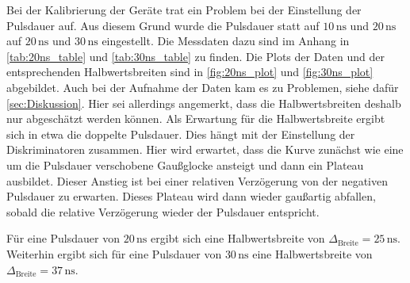 Bei der Kalibrierung der Geräte trat ein Problem bei der Einstellung der Pulsdauer auf.
Aus diesem Grund wurde die Pulsdauer statt auf $10 \, \unit{\nano\second}$ und $20 \, \unit{\nano\second}$ auf $20 \, \unit{\nano\second}$ und $30 \, \unit{\nano\second}$ eingestellt.
Die Messdaten dazu sind im Anhang in \autoref{tab:20ns_table} und \autoref{tab:30ns_table} zu finden.
Die Plots der Daten und der entsprechenden Halbwertsbreiten sind in \autoref{fig:20ns_plot} und \autoref{fig:30ns_plot} abgebildet.
Auch bei der Aufnahme der Daten kam es zu Problemen, siehe dafür \autoref{sec:Diskussion}.
Hier sei allerdings angemerkt, dass die Halbwertsbreiten deshalb nur abgeschätzt werden können.
Als Erwartung für die Halbwertsbreite ergibt sich in etwa die doppelte Pulsdauer.
Dies hängt mit der Einstellung der Diskriminatoren zusammen.
Hier wird erwartet, dass die Kurve zunächst wie eine um die Pulsdauer verschobene Gaußglocke ansteigt und dann ein Plateau ausbildet.
Dieser Anstieg ist bei einer relativen Verzögerung von der negativen Pulsdauer zu erwarten.
Dieses Plateau wird dann wieder gaußartig abfallen, sobald die relative Verzögerung wieder der Pulsdauer entspricht.

Für eine Pulsdauer von $20 \, \unit{\nano\second}$ ergibt sich eine Halbwertsbreite von $\Delta_\text{Breite} = 25 \, \unit{\nano\second}$.
Weiterhin ergibt sich für eine Pulsdauer von $30 \, \unit{\nano\second}$ eine Halbwertsbreite von $\Delta_\text{Breite} = 37 \, \unit{\nano\second}$.





